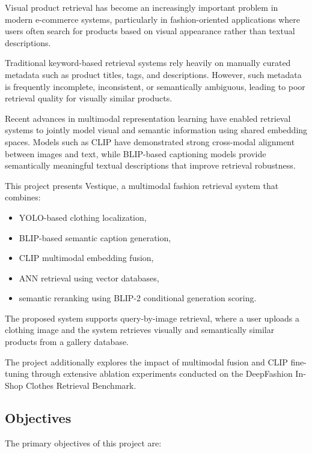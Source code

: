 \documentclass[11pt,a4paper]{article}
\begin{document}
Visual product retrieval has become an increasingly important problem in modern e-commerce systems, particularly in fashion-oriented applications where users often search for products based on visual appearance rather than textual descriptions.

Traditional keyword-based retrieval systems rely heavily on manually curated metadata such as product titles, tags, and descriptions. However, such metadata is frequently incomplete, inconsistent, or semantically ambiguous, leading to poor retrieval quality for visually similar products.

Recent advances in multimodal representation learning have enabled retrieval systems to jointly model visual and semantic information using shared embedding spaces. Models such as CLIP have demonstrated strong cross-modal alignment between images and text, while BLIP-based captioning models provide semantically meaningful textual descriptions that improve retrieval robustness.

This project presents Vestique, a multimodal fashion retrieval system that combines:
\begin{itemize}
    \item YOLO-based clothing localization,
    \item BLIP-based semantic caption generation,
    \item CLIP multimodal embedding fusion,
    \item ANN retrieval using vector databases,
    \item semantic reranking using BLIP-2 conditional generation scoring.
\end{itemize}

The proposed system supports query-by-image retrieval, where a user uploads a clothing image and the system retrieves visually and semantically similar products from a gallery database.

The project additionally explores the impact of multimodal fusion and CLIP fine-tuning through extensive ablation experiments conducted on the DeepFashion In-Shop Clothes Retrieval Benchmark.

\subsection{Objectives}

The primary objectives of this project are:
\end{document}
